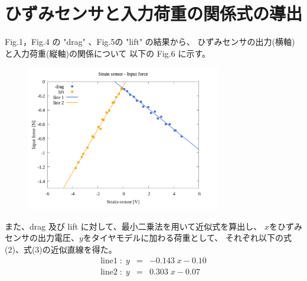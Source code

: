 \documentclass[twocolumn,a4j]{jsarticle}
\begin{document}
\section{ひずみセンサと入力荷重の関係式の導出}
Fig.1，Fig.4 の "drag" 、Fig.5の "lift" の結果から、
ひずみセンサの出力(横軸)と入力荷重(縦軸)の関係について
以下の Fig.6 に示す。\par
\begin{figure}[htbp]
    \footnotesize
    \begin{center}
        \includegraphics[width=85mm]{images/08_strainsensor-forces&line.png}
        \caption{}
    \end{center}
\end{figure}
また、drag 及び lift に対して、最小二乗法を用いて近似式を算出し、
$x$をひずみセンサの出力電圧、$y$をタイヤモデルに加わる荷重として、
それぞれ以下の式(2)、式(3)の近似直線を得た。
\begin{eqnarray}
    \mathrm{line 1} \; : \; y &=& -0.143 \; x - 0.10\\
    \mathrm{line 2} \; : \; y &=& 0.303 \; x - 0.07
\end{eqnarray}
\end{document}
